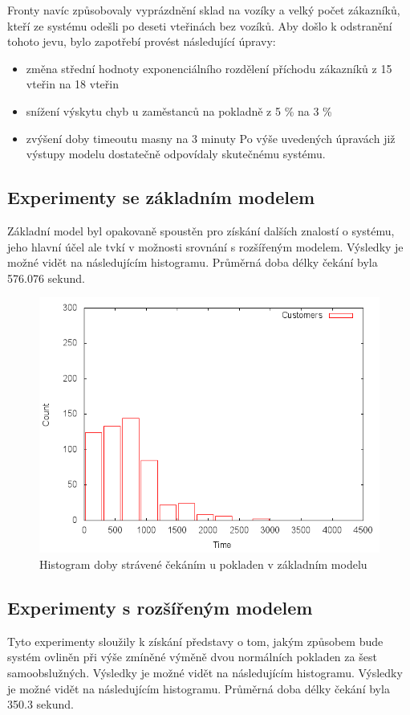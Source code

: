 \documentclass[12pt,a4paper,titlepage]{article}
\begin{document}
Fronty navíc způsobovaly vyprázdnění sklad na vozíky a velký počet zákazníků, kteří ze systému odešli po deseti vteřinách bez vozíků. Aby došlo k odstranění tohoto jevu, bylo zapotřebí provést následující úpravy:
\begin{itemize}
\item změna střední hodnoty exponenciálního rozdělení příchodu zákazníků z 15 vteřin na 18 vteřin
\item snížení výskytu chyb u zaměstanců na pokladně z 5 \% na 3 \%
\item zvýšení doby timeoutu masny na 3 minuty
Po výše uvedených úpravách již výstupy modelu dostatečně odpovídaly skutečnému systému. 
\end{itemize}
\subsection{Experimenty se základním modelem}
Základní model byl opakovaně spoustěn pro získání dalších znalostí o systému, jeho hlavní účel ale tvkí v možnosti srovnání s rozšířeným modelem. Výsledky je možné vidět na následujícím histogramu. Průměrná doba délky čekání byla 576.076 sekund. 

\begin{figure}[h]
\centering
\includegraphics[scale=0.75]{basic}
\caption{Histogram doby strávené čekáním u pokladen v základním modelu}
\end{figure}

\subsection{Experimenty s rozšířeným modelem}
Tyto experimenty sloužily k získání představy o tom, jakým způsobem bude systém ovliněn při výše zmíněné výměně dvou normálních pokladen za šest samoobslužných. Výsledky je možné vidět na následujícím histogramu. Výsledky je možné vidět na následujícím histogramu. Průměrná doba délky čekání byla 350.3 sekund.  
\end{document}
